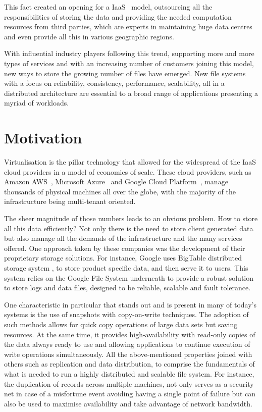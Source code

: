 This fact created an opening for a \gls{IaaS}~\cite{Mell2011} model, outsourcing all the responsibilities of storing the data and providing the needed computation resources from third parties, which are experts in maintaining huge data centres and even provide all this in various geographic regions.

With influential industry players following this trend, supporting more and more types of services and with an increasing number of customers joining this model, new ways to store the growing number of files have emerged. New file systems with a focus on reliability, consistency, performance, scalability, all in a distributed architecture are essential to a broad range of applications presenting a myriad of workloads.



\section{Motivation} %
\label{sec:intro_motivation}

Virtualisation is the pillar technology that allowed for the widespread of the IaaS cloud providers in a model of economies of scale. These cloud providers, such as Amazon AWS~\cite{aws_2017}, Microsoft Azure~\cite{azure_2017} and Google Cloud Platform~\cite{gcp_2017}, manage thousands of physical machines all over the globe, with the majority of the infrastructure being multi-tenant oriented. 

The sheer magnitude of those numbers leads to an obvious problem. How to store all this data efficiently? Not only there is the need to store client generated data but also manage all the demands of the infrastructure and the many services offered. One approach taken by these companies was the development of their proprietary storage solutions. For instance, Google uses BigTable distributed storage system \cite{Chang2006}, to store product specific data, and then serve it to users. This system relies on the Google File System underneath to provide a robust solution to store logs and data files, designed to be reliable, scalable and fault tolerance.

One characteristic in particular that stands out and is present in many of today's systems is the use of snapshots with copy-on-write techniques. The adoption of such methods allows for quick copy operations of large data sets but saving resources. At the same time, it provides high-availability with read-only copies of the data always ready to use and allowing applications to continue execution of write operations simultaneously.
All the above-mentioned properties joined with others such as replication and data distribution, to comprise the fundamentals of what is needed to run a highly distributed and scalable file system. For instance, the duplication of records across multiple machines, not only serves as a security net in case of a misfortune event avoiding having a single point of failure but can also be used to maximise availability and take advantage of network bandwidth. 

